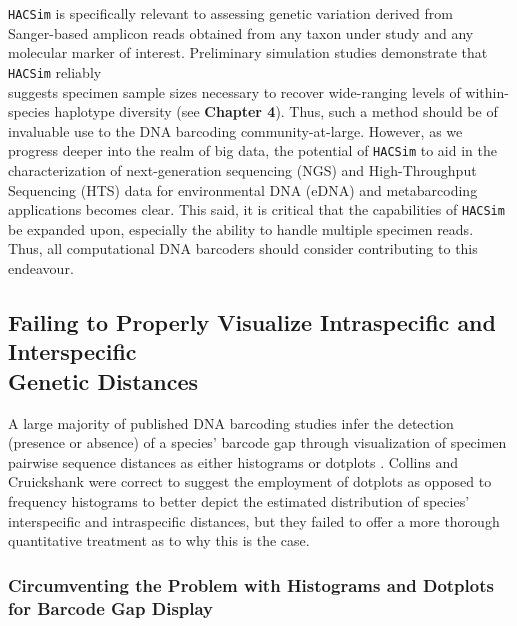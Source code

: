 {\tt HACSim} is specifically relevant to assessing genetic variation derived from \\ Sanger-based amplicon reads obtained from any taxon under study and any molecular marker of interest. Preliminary simulation studies demonstrate that {\tt HACSim} reliably \\ suggests specimen sample sizes necessary to recover wide-ranging levels of within-species haplotype diversity (see \textbf {Chapter 4}). Thus, such a method should be of invaluable use to the DNA barcoding community-at-large. However, as we progress deeper into the realm of big data, the potential of {\tt HACSim} to aid in the characterization of next-generation sequencing (NGS) and High-Throughput Sequencing (HTS) data for environmental DNA (eDNA) and metabarcoding applications becomes clear. This said, it is critical that the capabilities of {\tt HACSim} be expanded upon, especially the ability to handle multiple specimen reads. Thus, all computational DNA barcoders should consider contributing to this endeavour.



\subsection{Failing to Properly Visualize Intraspecific and Interspecific \\ Genetic Distances}

A large majority of published DNA barcoding studies infer the detection (presence or absence) of a species' barcode gap through visualization of specimen pairwise sequence distances as either histograms or dotplots \cite{collins2013seven}. Collins and Cruickshank \cite{collins2013seven} were correct to suggest the employment of dotplots as opposed to frequency histograms to better depict the estimated distribution of species' interspecific and intraspecific distances, but they failed to offer a more thorough quantitative treatment as to why this is the case. 



\subsubsection{Circumventing the Problem with Histograms and Dotplots for Barcode Gap Display}

